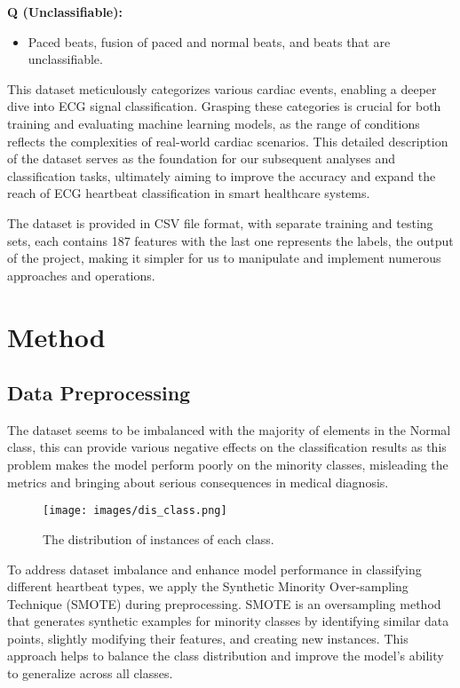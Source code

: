 \documentclass[]{acmsiggraph}
\begin{document}
\textbf{Q (Unclassifiable):}
\begin{itemize}
    \item Paced beats, fusion of paced and normal beats, and beats that are unclassifiable.
\end{itemize}

This dataset meticulously categorizes various cardiac events, enabling a deeper dive into ECG signal classification. Grasping these categories is crucial for both training and evaluating machine learning models, as the range of conditions reflects the complexities of real-world cardiac scenarios. This detailed description of the dataset serves as the foundation for our subsequent analyses and classification tasks, ultimately aiming to improve the accuracy and expand the reach of ECG heartbeat classification in smart healthcare systems.

The dataset is provided in CSV file format, with separate training and testing sets, each contains 187 features with the last one represents the labels, the output of the project, making it simpler for us to manipulate and implement numerous approaches and operations. 
\section{Method}
\subsection{Data Preprocessing}
The dataset seems to be imbalanced with the majority of elements in the Normal class, this can provide various negative effects on the classification results as this problem makes the model perform poorly on the minority classes, misleading the metrics and bringing about serious consequences in medical diagnosis.

\begin{figure}[h]\centering
 \texttt{[image: images/dis\_class.png]}
 \caption{\label{fig:reference}The distribution of instances of each class.}
\end{figure}

To address dataset imbalance and enhance model performance in classifying different heartbeat types, we apply the Synthetic Minority Over-sampling Technique (SMOTE) during preprocessing. SMOTE is an oversampling method that generates synthetic examples for minority classes by identifying similar data points, slightly modifying their features, and creating new instances. This approach helps to balance the class distribution and improve the model's ability to generalize across all classes.
\end{document}
